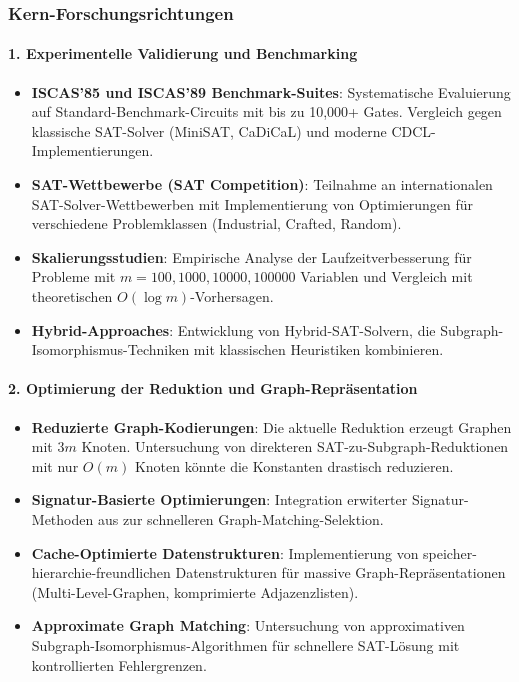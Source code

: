 ﻿\documentclass[a4paper,12pt]{article}
\theoremstyle{definition}
\begin{document}
\subsubsection{Kern-Forschungsrichtungen}

\paragraph{1. Experimentelle Validierung und Benchmarking}

\begin{itemize}
	\item \textbf{ISCAS'85 und ISCAS'89 Benchmark-Suites}: Systematische Evaluierung auf Standard-Benchmark-Circuits mit bis zu 10,000+ Gates. Vergleich gegen klassische SAT-Solver (MiniSAT, CaDiCaL) und moderne CDCL-Implementierungen.
	
	\item \textbf{SAT-Wettbewerbe (SAT Competition)}: Teilnahme an internationalen SAT-Solver-Wettbewerben mit Implementierung von Optimierungen für verschiedene Problemklassen (Industrial, Crafted, Random).
	
	\item \textbf{Skalierungsstudien}: Empirische Analyse der Laufzeitverbesserung für Probleme mit $m = 100, 1000, 10000, 100000$ Variablen und Vergleich mit theoretischen $O(\log m)$-Vorhersagen.
	
	\item \textbf{Hybrid-Approaches}: Entwicklung von Hybrid-SAT-Solvern, die Subgraph-Isomor\-phismus-Techniken mit klassischen Heuristiken kombinieren.
\end{itemize}

\paragraph{2. Optimierung der Reduktion und Graph-Repräsentation}

\begin{itemize}
	\item \textbf{Reduzierte Graph-Kodierungen}: Die aktuelle Reduktion erzeugt Graphen mit $3m$ Knoten. Untersuchung von direkteren SAT-zu-Subgraph-Reduktionen mit nur $O(m)$ Knoten könnte die Konstanten drastisch reduzieren.
	
	\item \textbf{Signatur-Basierte Optimierungen}: Integration erwiterter Signatur-Methoden aus \cite{Epp26} zur schnelleren Graph-Matching-Selektion.
	
	\item \textbf{Cache-Optimierte Datenstrukturen}: Implementierung von speicher-hierarchie-freundlichen Datenstrukturen für massive Graph-Repräsentationen (Multi-Level-Graphen, komprimierte Adjazenzlisten).
	
	\item \textbf{Approximate Graph Matching}: Untersuchung von approximativen Subgraph-Isomorphismus-Algorithmen für schnellere SAT-Lösung mit kontrollierten Fehlergrenzen.
\end{itemize}
\end{document}
